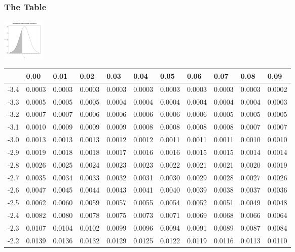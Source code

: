 \begin{frame}
  \frametitle{The Table}
  \vspace*{-5em}
  \hfill\includegraphics[width=2cm]{img/cummulativeDist}~~~~~~~~~~~~~~

  {
\fontsize{5pt}{5pt}
\selectfont

  \begin{tabular}{l|llllllllll}
     & 0.00   & 0.01   & 0.02   & 0.03   &  0.04   & 0.05   & 0.06   & 0.07   & 0.08  & 0.09 \\ \hline
-3.4 & 0.0003 & 0.0003 & 0.0003 & 0.0003 & 0.0003 & 0.0003 & 0.0003 & 0.0003 & 0.0003 & 0.0002 \\ 
-3.3 & 0.0005 & 0.0005 & 0.0005 & 0.0004 & 0.0004 & 0.0004 & 0.0004 & 0.0004 & 0.0004 & 0.0003 \\ 
-3.2 & 0.0007 & 0.0007 & 0.0006 & 0.0006 & 0.0006 & 0.0006 & 0.0006 & 0.0005 & 0.0005 & 0.0005 \\ 
-3.1 & 0.0010 & 0.0009 & 0.0009 & 0.0009 & 0.0008 & 0.0008 & 0.0008 & 0.0008 & 0.0007 & 0.0007 \\ 
-3.0 & 0.0013 & 0.0013 & 0.0013 & 0.0012 & 0.0012 & 0.0011 & 0.0011 & 0.0011 & 0.0010 & 0.0010 \\ 
-2.9 & 0.0019 & 0.0018 & 0.0018 & 0.0017 & 0.0016 & 0.0016 & 0.0015 & 0.0015 & 0.0014 & 0.0014 \\ 
-2.8 & 0.0026 & 0.0025 & 0.0024 & 0.0023 & 0.0023 & 0.0022 & 0.0021 & 0.0021 & 0.0020 & 0.0019 \\ 
-2.7 & 0.0035 & 0.0034 & 0.0033 & 0.0032 & 0.0031 & 0.0030 & 0.0029 & 0.0028 & 0.0027 & 0.0026 \\ 
-2.6 & 0.0047 & 0.0045 & 0.0044 & 0.0043 & 0.0041 & 0.0040 & 0.0039 & 0.0038 & 0.0037 & 0.0036 \\ 
-2.5 & 0.0062 & 0.0060 & 0.0059 & 0.0057 & 0.0055 & 0.0054 & 0.0052 & 0.0051 & 0.0049 & 0.0048 \\ 
-2.4 & 0.0082 & 0.0080 & 0.0078 & 0.0075 & 0.0073 & 0.0071 & 0.0069 & 0.0068 & 0.0066 & 0.0064 \\ 
-2.3 & 0.0107 & 0.0104 & 0.0102 & 0.0099 & 0.0096 & 0.0094 & 0.0091 & 0.0089 & 0.0087 & 0.0084 \\ 
-2.2 & 0.0139 & 0.0136 & 0.0132 & 0.0129 & 0.0125 & 0.0122 & 0.0119 & 0.0116 & 0.0113 & 0.0110 \\ 

\end{tabular}}
\end{frame}

